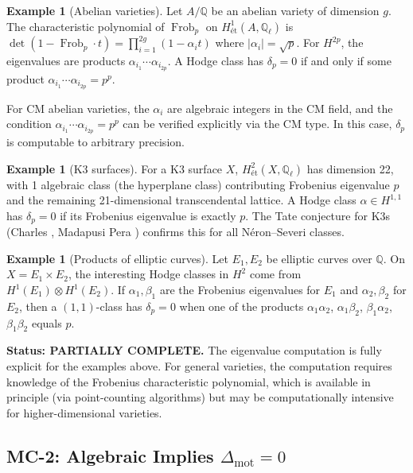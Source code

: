 \documentclass[11pt]{article}
\theoremstyle{definition}
\newtheorem{example}[theorem]{Example}
\DeclareMathOperator{\Frob}{Frob}
\begin{document}
\begin{example}[Abelian varieties]
\label{ex:abelian}
Let $A/\mathbb{Q}$ be an abelian variety of dimension $g$.  The
characteristic polynomial of $\Frob_p$ on
$H^1_{\text{\'et}}(A, \mathbb{Q}_\ell)$ is
$\det(1 - \Frob_p \cdot t) = \prod_{i=1}^{2g} (1 - \alpha_i t)$
where $|\alpha_i| = \sqrt{p}$.  For $H^{2p}$, the eigenvalues are
products $\alpha_{i_1} \cdots \alpha_{i_{2p}}$.  A Hodge class has
$\delta_p = 0$ if and only if some product
$\alpha_{i_1} \cdots \alpha_{i_{2p}} = p^p$.

For CM abelian varieties, the $\alpha_i$ are algebraic integers in the
CM field, and the condition $\alpha_{i_1} \cdots \alpha_{i_{2p}} = p^p$
can be verified explicitly via the CM type.  In this case, $\delta_p$
is computable to arbitrary precision.
\end{example}

\begin{example}[K3 surfaces]
\label{ex:k3}
For a K3 surface $X$, $H^2_{\text{\'et}}(X, \mathbb{Q}_\ell)$ has
dimension 22, with 1 algebraic class (the hyperplane class) contributing
Frobenius eigenvalue $p$ and the remaining 21-dimensional transcendental
lattice.  A Hodge class $\alpha \in H^{1,1}$ has $\delta_p = 0$ if its
Frobenius eigenvalue is exactly $p$.  The Tate conjecture for K3s
(Charles \cite{Charles}, Madapusi Pera \cite{MP}) confirms this for all
N\'eron--Severi classes.
\end{example}

\begin{example}[Products of elliptic curves]
\label{ex:product-curves}
Let $E_1, E_2$ be elliptic curves over $\mathbb{Q}$.
On $X = E_1 \times E_2$, the interesting Hodge classes in $H^2$ come
from $H^1(E_1) \otimes H^1(E_2)$.  If $\alpha_1, \beta_1$ are the
Frobenius eigenvalues for $E_1$ and $\alpha_2, \beta_2$ for $E_2$,
then a $(1,1)$-class has $\delta_p = 0$ when one of the products
$\alpha_1 \alpha_2$, $\alpha_1 \beta_2$, $\beta_1 \alpha_2$,
$\beta_1 \beta_2$ equals $p$.
\end{example}

\textbf{Status: PARTIALLY COMPLETE.}  The eigenvalue computation is fully
explicit for the examples above.  For general varieties, the computation
requires knowledge of the Frobenius characteristic polynomial, which is
available in principle (via point-counting algorithms) but may be
computationally intensive for higher-dimensional varieties.

\subsection{MC-2: Algebraic Implies $\Delta_{\mathrm{mot}} = 0$}
\label{sec:mc2}
\end{document}
